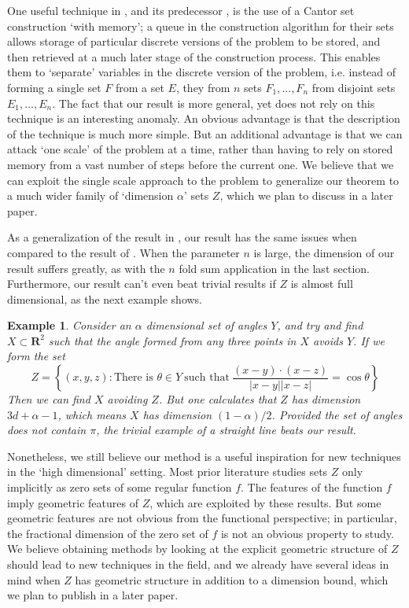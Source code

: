 \documentclass[usenames,dvipsnames]{article}
\theoremstyle{plain}
\newtheorem*{example}{Example}
\theoremstyle{plain}
\begin{document}
One useful technique in \cite{MalabikaRob}, and its predecessor \cite{KeletiDimOneSet}, is the use of a Cantor set construction `with memory'; a queue in the construction algorithm for their sets allows storage of particular discrete versions of the problem to be stored, and then retrieved at a much later stage of the construction process. This enables them to `separate' variables in the discrete version of the problem, i.e. instead of forming a single set $F$ from a set $E$, they from $n$ sets $F_1, \dots, F_n$ from disjoint sets $E_1, \dots, E_n$. The fact that our result is more general, yet does not rely on this technique is an interesting anomaly. An obvious advantage is that the description of the technique is much more simple. But an additional advantage is that we can attack `one scale' of the problem at a time, rather than having to rely on stored memory from a vast number of steps before the current one. We believe that we can exploit the single scale approach to the problem to generalize our theorem to a much wider family of `dimension $\alpha$' sets $Z$, which we plan to discuss in a later paper.

As a generalization of the result in \cite{MalabikaRob}, our result has the same issues when compared to the result of \cite{Mathe}. When the parameter $n$ is large, the dimension of our result suffers greatly, as with the $n$ fold sum application in the last section. Furthermore, our result can't even beat trivial results if $Z$ is almost full dimensional, as the next example shows.

\begin{example}
	Consider an $\alpha$ dimensional set of angles $Y$, and try and find $X \subset \mathbf{R}^2$ such that the angle formed from any three points in $X$ avoids $Y$. If we form the set
	\[ Z = \left\{ (x,y,z): \text{There is $\theta \in Y$}\ \text{such that}\ \frac{(x - y) \cdot (x - z)}{|x - y||x - z|} = \cos \theta \right\} \]
	Then we can find $X$ avoiding $Z$. But one calculates that $Z$ has dimension $3d + \alpha - 1$, which means $X$ has dimension $(1 - \alpha) / 2$. Provided the set of angles does not contain $\pi$, the trivial example of a straight line beats our result.
\end{example}

Nonetheless, we still believe our method is a useful inspiration for new techniques in the `high dimensional' setting. Most prior literature studies sets $Z$ only implicitly as zero sets of some regular function $f$. The features of the function $f$ imply geometric features of $Z$, which are exploited by these results. But some geometric features are not obvious from the functional perspective; in particular, the fractional dimension of the zero set of $f$ is not an obvious property to study. We believe obtaining methods by looking at the explicit geometric structure of $Z$ should lead to new techniques in the field, and we already have several ideas in mind when $Z$ has geometric structure in addition to a dimension bound, which we plan to publish in a later paper.
\end{document}

